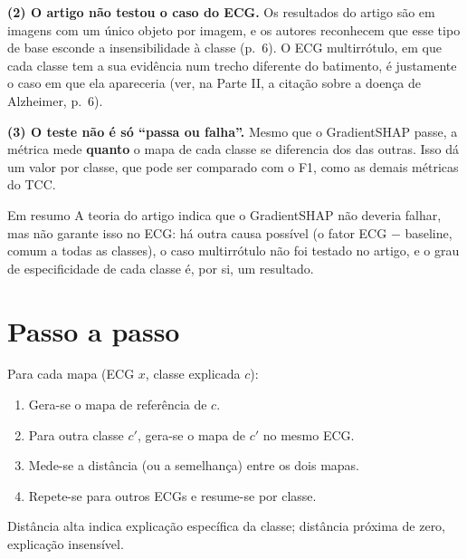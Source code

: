 \documentclass[11pt,a4paper]{article}
\begin{document}
\textbf{(2) O artigo não testou o caso do ECG.} Os resultados do artigo são em imagens com um único objeto por imagem, e os autores reconhecem que esse tipo de base esconde a insensibilidade à classe (p.~6). O ECG multirrótulo, em que cada classe tem a sua evidência num trecho diferente do batimento, é justamente o caso em que ela apareceria (ver, na Parte II, a citação sobre a doença de Alzheimer, p.~6).

\textbf{(3) O teste não é só “passa ou falha”.} Mesmo que o GradientSHAP passe, a métrica mede \textbf{quanto} o mapa de cada classe se diferencia dos das outras. Isso dá um valor por classe, que pode ser comparado com o F1, como as demais métricas do TCC.

\begin{infobox}[note]{Em resumo}
A teoria do artigo indica que o GradientSHAP não deveria falhar, mas não garante isso no ECG: há outra causa possível (o fator ECG $-$ baseline, comum a todas as classes), o caso multirrótulo não foi testado no artigo, e o grau de especificidade de cada classe é, por si, um resultado.
\end{infobox}

\section{Passo a passo}
Para cada mapa (ECG $x$, classe explicada $c$):
\begin{enumerate}
\item Gera-se o mapa de referência de $c$.
\item Para outra classe $c'$, gera-se o mapa de $c'$ no mesmo ECG.
\item Mede-se a distância (ou a semelhança) entre os dois mapas.
\item Repete-se para outros ECGs e resume-se por classe.
\end{enumerate}
Distância alta indica explicação específica da classe; distância próxima de zero, explicação insensível.
\end{document}
